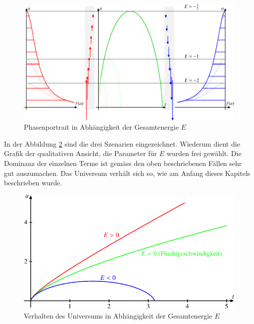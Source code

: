 \begin{refsection}
\begin{figure}
	\centering
	\includegraphics[width  = \textwidth]{friedmann/images/friedmann-6.pdf}
	\caption{Phasenportrait in Abhängigkeit der Gesamtenergie $E$
		\label{friedmann:phasenportrait}}
\end{figure}%
In der Abbildung \ref{friedmann:universumMasse} sind die drei Szenarien eingezeichnet. Wiederum dient die Grafik der qualitativen Ansicht, die Parameter für $E$ wurden frei gewählt. Die Dominanz der einzelnen Terme ist gemäss den oben beschriebenen Fällen sehr gut auszumachen. Das Universum verhält sich so, wie am Anfang dieses Kapitels beschrieben wurde.

\begin{figure}[h]
	\centering
	\includegraphics{friedmann/images/friedmann-4.pdf}
	\caption{Verhalten des Universums in Abhängigkeit der Gesamtenergie $E$
		\label{friedmann:universumMasse}}
\end{figure}%


\end{refsection}
